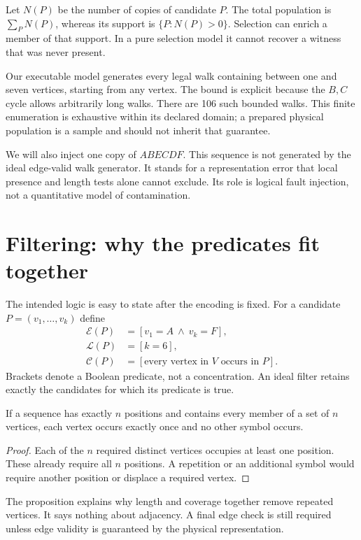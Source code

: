 Let $N(P)$ be the number of copies of candidate $P$. The total population is $\sum_P N(P)$, whereas its support is $\{P:N(P)>0\}$. Selection can enrich a member of that support. In a pure selection model it cannot recover a witness that was never present.

Our executable model generates every legal walk containing between one and seven vertices, starting from any vertex. The bound is explicit because the $B,C$ cycle allows arbitrarily long walks. There are 106 such bounded walks. This finite enumeration is exhaustive within its declared domain; a prepared physical population is a sample and should not inherit that guarantee.

We will also inject one copy of $ABECDF$. This sequence is not generated by the ideal edge-valid walk generator. It stands for a representation error that local presence and length tests alone cannot exclude. Its role is logical fault injection, not a quantitative model of contamination.

\section{Filtering: why the predicates fit together}\label{sec:filter}
The intended logic is easy to state after the encoding is fixed. For a candidate $P=(v_1,\ldots,v_k)$ define
\[
 \begin{aligned}
 \mathcal E(P)&=[v_1=A\ \land\ v_k=F],\\
 \mathcal L(P)&=[k=6],\\
 \mathcal C(P)&=[\text{every vertex in }V\text{ occurs in }P].
 \end{aligned}
\]
Brackets denote a Boolean predicate, not a concentration. An ideal filter retains exactly the candidates for which its predicate is true.

\begin{proposition}
If a sequence has exactly $n$ positions and contains every member of a set of $n$ vertices, each vertex occurs exactly once and no other symbol occurs.
\end{proposition}
\begin{proof}
Each of the $n$ required distinct vertices occupies at least one position. These already require all $n$ positions. A repetition or an additional symbol would require another position or displace a required vertex.
\end{proof}
The proposition explains why length and coverage together remove repeated vertices. It says nothing about adjacency. A final edge check is still required unless edge validity is guaranteed by the physical representation.

